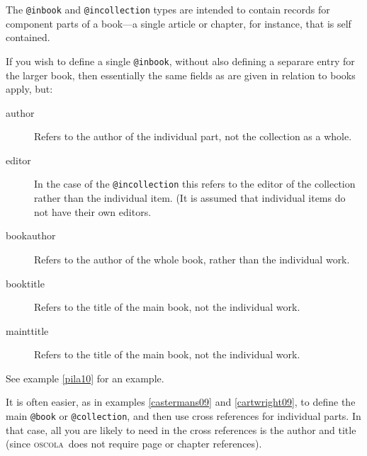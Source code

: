 \documentclass[a4paper,
               11pt,
	       DIV=1,			   
	       footinclude=false]
	      {scrartcl}
\newcommand{\oscolashort}{\textsc{oscola}\nocite{oscola}}
\begin{document}
The \texttt{@inbook} and \texttt{@incollection} types are intended to
contain records for component parts of a book---a single article or
chapter, for instance, that is self contained.

If you wish to define a single \texttt{@inbook}, without also defining
a separare entry for the larger book, then essentially the same fields
as are given in relation to books apply, but: 
\begin{description}
\item[author]
Refers to the author of the individual part, not the
collection as a whole.  
\item[editor] 
In the case of the
\texttt{@incollection} this refers to the editor of the collection
rather than the individual item. (It is assumed that individual items
do not have their own editors.  
\item[bookauthor] 
Refers to the author of the whole book, rather than the individual work.  
\item[booktitle]
Refers to the title of the main book, not the individual work.
\item[mainttitle] 
Refers to the title of the main book, not the
individual work.  
\end{description}
See example \ref{pila10} for an example.

It is often easier, as in examples \ref{castermans09} and \ref{cartwright09}, to define the main \texttt{@book} or
\texttt{@collection}, and then use cross references for individual
parts. In that case, all you are likely to need in the cross
references is the author and title (since \oscolashort\ does not
require page or chapter references).
\end{document}
